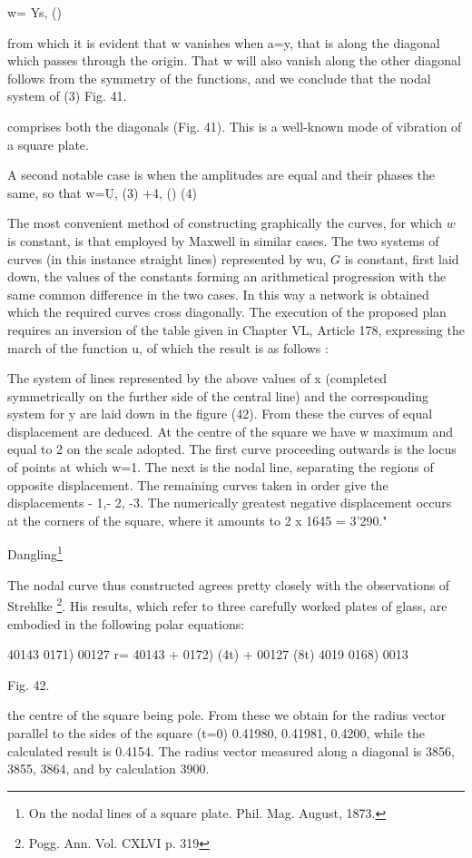 w= Ys, ()

from which it is evident that w vanishes when a=y, that is along the
diagonal which passes through the origin. That w will also vanish along
the other diagonal follows from the symmetry of the functions, and we
conclude that the nodal system of (3) Fig. 41.


comprises both the diagonals (Fig. 41). This is a well-known mode of
vibration of a square plate.

A second notable case is when the amplitudes are equal and their phases
the same, so that w=U, (3) +4, () (4)

The most convenient method of constructing graphically the curves, for
which \(w\) is constant, is that employed by Maxwell in similar cases. The two
systems of curves (in this instance straight lines) represented by wu,
\(G\) is constant, first laid down, the values of the constants forming an
arithmetical progression with the same common difference in the two
cases. In this way a network is obtained which the required curves cross
diagonally. The execution of the proposed plan requires an inversion
of the table given in Chapter VL, Article 178, expressing the march of
the function u, of which the result is as follows :

The system of lines represented by the above values of x
(completed symmetrically on the further side of the central line) and
the corresponding system for y are laid down in the figure (42). From
these the curves of equal displacement are deduced. At the centre of the
square we have w maximum and equal to 2 on the scale adopted. The first
curve proceeding outwards is the locus of points at which w=1. The next
is the nodal line, separating the regions of opposite displacement. The
remaining curves taken in order give the displacements - 1,- 2, -3. The
numerically greatest negative displacement occurs at the corners of the
square, where it amounts to 2 x 1645 = 3'290."

Dangling\footnote{ On the nodal lines of a square plate. Phil. Mag. August, 1873.}

The nodal curve thus constructed agrees pretty closely with the
observations of Strehlke
\footnote{Pogg. Ann. Vol. CXLVI p. 319}. His
results, which refer to three carefully worked plates of glass, are
embodied in the following polar equations:

40143 0171) 00127 r= 40143 + 0172) (4t) + 00127 (8t) 4019 0168) 0013

Fig. 42.

the centre of the square being pole. From these we obtain for the radius
vector parallel to the sides of the square (t=0) 0.41980, 0.41981,
0.4200, while the calculated result is 0.4154. The radius vector
measured along a diagonal is 3856, 3855, 3864, and by calculation 3900.

